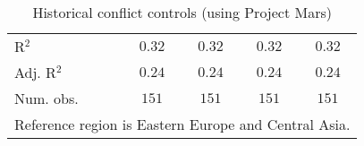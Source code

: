 \begin{table}[H]
\begin{center}
{\begin{tabular}{l c c c c}
\hline
R$^2$                                 & $0.32$      & $0.32$      & $0.32$      & $0.32$      \\
Adj. R$^2$                            & $0.24$      & $0.24$      & $0.24$      & $0.24$      \\
Num. obs.                             & $151$       & $151$       & $151$       & $151$       \\
\hline
\multicolumn{5}{l}{\scriptsize{Reference region is Eastern Europe and Central Asia.}}
\end{tabular}
}
\caption{Historical conflict controls (using Project Mars)}
\label{Tab: Hist_Conflict_Rob_Pm}
\end{center}
\end{table}
